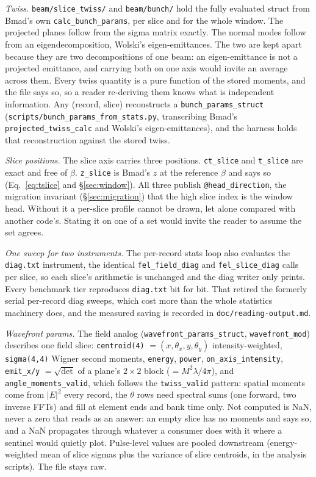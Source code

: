 \documentclass[11pt]{article}
\newcommand{\code}[1]{\texttt{#1}}
\begin{document}
\emph{Twiss.} \code{beam/slice\_twiss/} and \code{beam/bunch/} hold the fully
evaluated struct from Bmad's own \code{calc\_bunch\_params}, per slice and for the
whole window. The projected planes follow from the sigma matrix exactly. The normal
modes follow from an eigendecomposition, Wolski's eigen-emittances. The two are kept
apart because they are two decompositions of one beam: an eigen-emittance is not a
projected emittance, and carrying both on one axis would invite an average across
them. Every twiss quantity is a pure function of the stored moments, and the file says
so, so a reader re-deriving them knows what is independent information. Any (record,
slice) reconstructs a \code{bunch\_params\_struct}
(\code{scripts/bunch\_params\_from\_stats.py}, transcribing Bmad's
\code{projected\_twiss\_calc} and Wolski's eigen-emittances), and the harness holds
that reconstruction against the stored twiss.

\emph{Slice positions.} The slice axis carries three positions. \code{ct\_slice} and
\code{t\_slice} are exact and free of $\beta$. \code{z\_slice} is Bmad's $z$ at the
reference $\beta$ and says so (Eq.~\ref{eq:tslice} and \S\ref{sec:window}). All three
publish \code{@head\_direction}, the migration invariant (\S\ref{sec:migration}) that
the high slice index is the window head. Without it a per-slice profile cannot be
drawn, let alone compared with another code's. Stating it on one of a set would invite
the reader to assume the set agrees.

\emph{One sweep for two instruments.} The per-record stats loop also evaluates the
\code{diag.txt} instrument, the identical \code{fel\_field\_diag} and
\code{fel\_slice\_diag} calls per slice, so each slice's arithmetic is unchanged and
the diag writer only prints. Every benchmark tier reproduces \code{diag.txt} bit for
bit. That retired the formerly serial per-record diag sweeps, which cost more than the
whole statistics machinery does, and the measured saving is recorded in
\code{doc/reading-output.md}.

\emph{Wavefront params.} The field analog (\code{wavefront\_params\_struct},
\code{wavefront\_mod}) describes one field slice: \code{centroid(4)} $= (x,
\theta_x, y, \theta_y)$ intensity-weighted, \code{sigma(4,4)} Wigner second moments,
\code{energy}, \code{power}, \code{on\_axis\_intensity}, \code{emit\_x/y}
$= \sqrt{\det}$ of a plane's $2\times2$ block ($= M^2\lambda/4\pi$), and
\code{angle\_moments\_valid}, which follows the \code{twiss\_valid} pattern: spatial moments
come from $|E|^2$ every record, the $\theta$ rows need spectral sums (one forward, two
inverse FFTs) and fill at element ends and bank time only. Not computed is NaN, never a
zero that reads as an answer: an empty slice has no moments and says so, and a NaN
propagates through whatever a consumer does with it where a sentinel would quietly plot.
Pulse-level values are pooled downstream (energy-weighted mean of slice sigmas plus the
variance of slice centroids, in the analysis scripts). The file stays raw.
\end{document}
